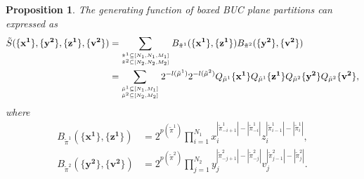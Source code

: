 \documentclass[11pt,reqno]{amsart}
\numberwithin{equation}{section}
\newtheorem{proposition}[theorem]{Proposition}
\begin{document}
	
	\begin{proposition}
		The generating function of boxed BUC plane partitions can expressed as
		\begin{align}\label{schs}
			\tilde{S}(\{\mathbf{x^1}\}, \{\mathbf{y^2}\}, \{\mathbf{z^1}\}, \{\mathbf{v^2}\})
			=&\sum_{{\tilde{\pi}^{1} \subseteq [N_{1}, N_{1}, M_{1}]}
				\atop{\tilde{\pi}^{2} \subseteq [N_{2}, N_{2}, M_{2}]}}
			B_{\tilde{\pi}^{1} }(\{\mathbf{x^1}\}, \{\mathbf{z^1}\}) B_{\tilde{\pi}^{2} }(\{\mathbf{y^2}\}, \{\mathbf{v^2}\})\notag\\
			=&\sum_{{ \tilde{\mu}^{1} \subseteq [N_1,M_1]}\atop{\tilde{\mu}^{2} \subseteq [N_2,M_2]}}
			2^{- l(\tilde{\mu}^{1})}2^{- l(\tilde{\mu}^{2})}
			Q_{\tilde{\mu}^{1}}\{\mathbf{x^1}\}  Q_{\tilde{\mu}^{1}}\{\mathbf{z^1}\}
			Q_{\tilde{\mu}^{2}}\{\mathbf{y^2}\}  Q_{\tilde{\mu}^{2}}\{\mathbf{v^2}\},
		\end{align}
		where
		\begin{align}
			B_{\tilde{\pi}^{1} }(\{\mathbf{x^1}\}, \{\mathbf{z^1}\})
			&=2^{p(\tilde{\pi}^1)}
			\prod_{i=1}^{N_1}
			x_i^{|\tilde{\pi}^{1}_{-i+1}| - |\tilde{\pi}^{1}_{-i}|}
			z_i^{|\tilde{\pi}^{1}_{i-1}| - |\tilde{\pi}^{1}_i|},   \\
			B_{\tilde{\pi}^{2} }(\{\mathbf{y^2}\}, \{\mathbf{v^2}\})
			&=2^{p(\tilde{\pi}^2)}
			\prod_{j=1}^{N_2}
			y_j^{|\tilde{\pi}^{2}_{-j+1}| - |\tilde{\pi}^{2}_{-j}|}
			v_j^{|\tilde{\pi}^{2}_{j-1}| - |\tilde{\pi}^{2}_j|}.
		\end{align}
	\end{proposition}
	
\end{document}

